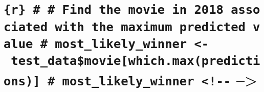 \documentclass[
]{article}
\begin{document}
\hypertarget{r-find-the-movie-in-2018-associated-with-the-maximum-predicted-value-most_likely_winner---test_datamoviewhich.maxpredictions-most_likely_winner---}{%
\section{\texorpdfstring{\texttt{\{r\}\ \#\ \#\ Find\ the\ movie\ in\ 2018\ associated\ with\ the\ maximum\ predicted\ value\ \#\ most\_likely\_winner\ \textless{}-\ test\_data\$movie{[}which.max(predictions){]}\ \#\ most\_likely\_winner\ \textless{}!-\/-}
--\textgreater{}}{\{r\} \# \# Find the movie in 2018 associated with the maximum predicted value \# most\_likely\_winner \textless- test\_data\$movie{[}which.max(predictions){]} \# most\_likely\_winner \textless!-\/- --\textgreater{}}}\label{r-find-the-movie-in-2018-associated-with-the-maximum-predicted-value-most_likely_winner---test_datamoviewhich.maxpredictions-most_likely_winner---}}
\end{document}
